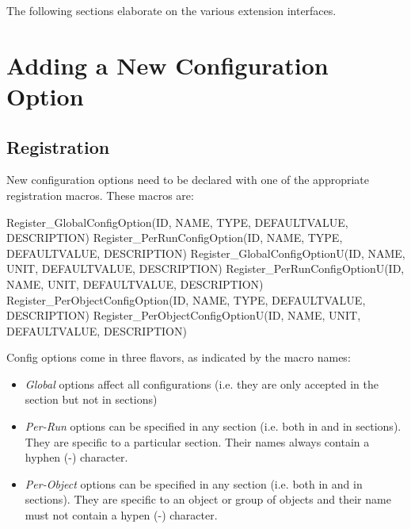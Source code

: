 The following sections elaborate on the various extension interfaces.


\section{Adding a New Configuration Option}
\label{sec:plugin-exts:accessing-config}

\subsection{Registration}

New configuration options need to be declared with one of the appropriate
registration macros. These macros are:

\begin{cpp}
Register_GlobalConfigOption(ID, NAME, TYPE, DEFAULTVALUE, DESCRIPTION)
Register_PerRunConfigOption(ID, NAME, TYPE, DEFAULTVALUE, DESCRIPTION)
Register_GlobalConfigOptionU(ID, NAME, UNIT, DEFAULTVALUE, DESCRIPTION)
Register_PerRunConfigOptionU(ID, NAME, UNIT, DEFAULTVALUE, DESCRIPTION)
Register_PerObjectConfigOption(ID, NAME, TYPE, DEFAULTVALUE, DESCRIPTION)
Register_PerObjectConfigOptionU(ID, NAME, UNIT, DEFAULTVALUE, DESCRIPTION)
\end{cpp}

Config options come in three flavors, as indicated by the macro names:

\begin{itemize}
  \item \textit{Global} options affect all configurations (i.e. they are
      only accepted in the \ttt{[General]} section but not in
       sections)
  \item \textit{Per-Run} options can be specified in any section
      (i.e. both in \ttt{[General]} and in  sections).
      They are specific to a particular section. Their names always contain
      a hyphen (-) character.
  \item \textit{Per-Object} options can be specified in any section
      (i.e. both in \ttt{[General]} and in  sections).
      They are specific to an object or group of objects and their name must
      not contain a hypen (-) character.
\end{itemize}

